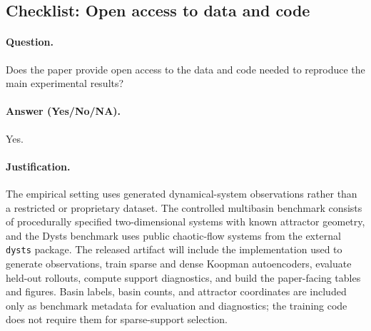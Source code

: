 \subsection{Checklist: Open access to data and code}
\label{app:checklist_open_data_code}

\paragraph{Question.}
Does the paper provide open access to the data and code needed to reproduce the
main experimental results?

\paragraph{Answer (Yes/No/NA).}
Yes.

\paragraph{Justification.}
The empirical setting uses generated dynamical-system observations rather than a
restricted or proprietary dataset. The controlled multibasin benchmark consists
of procedurally specified two-dimensional systems with known attractor geometry,
and the Dysts benchmark uses public chaotic-flow systems from the external
\texttt{dysts} package. The released artifact will include the implementation
used to generate observations, train sparse and dense Koopman autoencoders,
evaluate held-out rollouts, compute support diagnostics, and build the
paper-facing tables and figures. Basin labels, basin counts, and attractor
coordinates are included only as benchmark metadata for evaluation and
diagnostics; the training code does not require them for sparse-support
selection.

